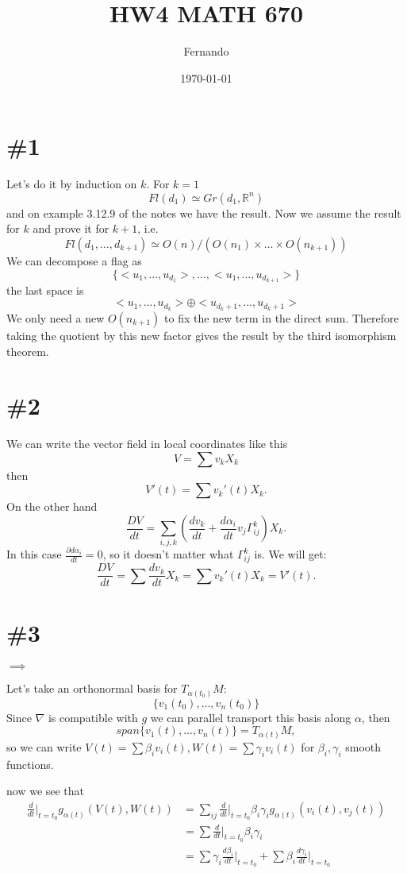 \documentclass{article}
\begin{document}
\newcommand{\R}{\mathbb{R}}

\title{HW4 MATH 670}
\author{Fernando}
\date{\today}
\maketitle

\section*{\#1}
Let's do it by induction on \(k\). For \(k=1\)
\[
  Fl(d_1)\simeq Gr(d_1,\mathbb{R}^n)
\]
and on example 3.12.9 of the notes we have the result.
Now we assume the result for \(k\) and prove it for \(k+1\), i.e.
\[
  Fl(d_1,\dots,d_{k+1})\simeq O(n)/(O(n_1)\times\dots\times O(n_{k+1}))
\]
We can decompose a flag as
\[
  \{<u_1,\dots,u_{d_1}>,\dots,<u_1,\dots,u_{d_{k+1}}>\}
\]
the last space is
\[
  <u_1,\dots,u_{d_k}>\oplus<u_{d_k+1},\dots,u_{d_k+1}>
\]
We only need a new \(O(n_{k+1})\) to fix the new term in the direct sum. Therefore taking the quotient by this new factor gives the result
by the third isomorphism theorem.
\section*{\#2}
We can write the vector field in local coordinates like this
\[
  V=\sum v_kX_k
\]
then
\[
  V'(t)=\sum v_k'(t)X_k.
\]
On the other hand
\[
  \frac{DV}{dt}=\sum_{i,j,k}\left(\frac{dv_k}{dt}+\frac{d\alpha_i}{dt}v_j\Gamma^k_{ij}\right)X_k.
\]
In this case \(\frac{\partial d\alpha_i}{dt}=0\), so it doesn't matter what \(\Gamma^k_{ij}\) is. We will get:
\[
  \frac{DV}{dt}=\sum\frac{dv_k}{dt}X_k=\sum v_k'(t)X_k=V'(t).
\]
\section*{\#3}

\(\implies\)

Let's take an orthonormal basis for \(T_{\alpha(t_0)}M\):
\[\{v_1(t_0),\dots,v_n(t_0)\}\]
Since \(\nabla\) is compatible with \(g\) we can parallel transport this basis along \(\alpha\),
then
\[
  span\{v_1(t),\dots,v_n(t)\}=T_{\alpha(t)}M,
\]
so we can write \( V(t)=\sum\beta_iv_i(t), W(t)=\sum\gamma_iv_i(t)
\) for \(\beta_i,\gamma_i\) smooth functions.

now we see that
\begin{align}
  \label{eq:LHS}
  \frac{d}{dt}\bigg|_{t=t_0}g_{\alpha(t)}(V(t),W(t))&=\sum_{ij}
  \frac{d}{dt}\bigg|_{t=t_0}\beta_i\gamma_ig_{\alpha(t)}(v_i(t),v_j(t)) \nonumber\\
  &=\sum\frac{d}{dt}\bigg|_{t=t_0}\beta_i\gamma_i \nonumber\\
  &=\sum\gamma_i\frac{d\beta_i}{dt}\bigg|_{t=t_0}+\sum\beta_i\frac{d\gamma_i}{dt}\bigg|_{t=t_0}
\end{align}
\end{document}
